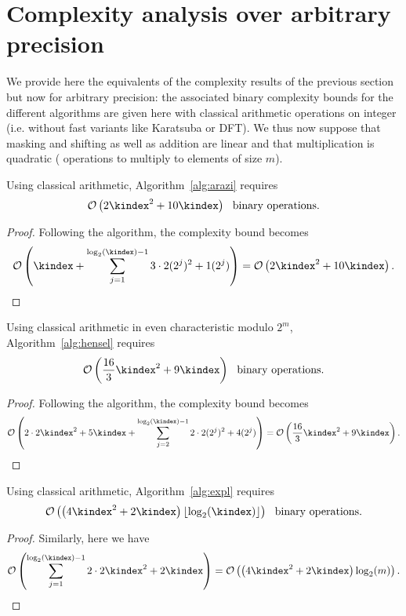 \section{Complexity analysis over arbitrary precision}\label{sec:ana}
We provide here the equivalents of the complexity results of the previous
section but now for arbitrary precision: the associated binary
complexity bounds for the different algorithms are given here with classical
arithmetic operations on integer (i.e. without fast variants like Karatsuba or
DFT). 
We thus now suppose that masking and shifting as well as addition are linear
and that multiplication is quadratic ( operations to multiply to
elements of size $m$).
\begin{lemma}\label{lem:arazi} 
Using classical arithmetic, Algorithm~\ref{alg:arazi} requires
$$\bigO{2\kindex^2+10\kindex} ~~\text{binary operations.}$$
\end{lemma}
\begin{proof} Following the algorithm, the complexity bound becomes 
$$\bigO{\kindex+\sum_{j=1}^{\log_2(\kindex)-1} 3 \cdot 2(2^j)^2 + 1 (2^j) }=\bigO{2\kindex^2+10\kindex}.$$
\end{proof}
\smallskip
\begin{lemma}\label{lem:henarb} 
Using classical arithmetic in even characteristic modulo $2^m$, Algorithm~\ref{alg:hensel} requires $$\bigO{\frac{16}{3}\kindex^2+9\kindex} ~~\text{binary operations.}$$
\end{lemma}
\begin{proof} Following the algorithm, the complexity bound becomes
  $$\bigO{2\cdot 2\kindex^2+5\kindex+\sum_{j=2}^{\log_2(\kindex)-1} 2 \cdot 2(2^j)^2 + 4(2^j) }=\bigO{ \frac{16}{3}\kindex^2+9\kindex}.$$
\end{proof}
\smallskip
\begin{lemma}\label{lem:explarb} 
Using classical arithmetic, Algorithm~\ref{alg:expl} requires
$$\bigO{\left(4\kindex^2+2\kindex\right)\lfloor\log_2(\kindex)\rfloor} ~~\text{binary operations.}$$
\end{lemma}
\begin{proof} Similarly, here we have 
$$\bigO{\sum_{j=1}^{\log_2(\kindex)-1} 2 \cdot 2\kindex^2 + 2\kindex}=\bigO{\left(4\kindex^2+2\kindex\right)\log_2(m)}.$$\end{proof}


